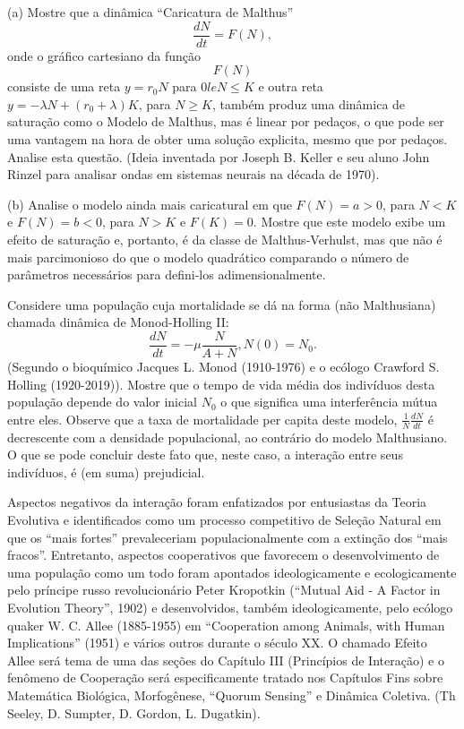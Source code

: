     \begin{exercise}
    \begin{description}
    \item (a) Mostre que a dinâmica ``Caricatura de Malthus''
    \[\dfrac{dN}{dt} =  F(N),\]
    onde o gráfico cartesiano da função \[F(N)\] consiste de uma reta \(y = r_0 N\) para \(0 le N \le K\) e outra reta \(y =-\lambda N + (r_0 + \lambda) K\), para \(N \ge K\), também produz uma dinâmica de saturação como o Modelo de Malthus, mas é linear por pedaços, o que pode ser uma vantagem na hora de obter uma solução explicita, mesmo que por pedaços. Analise esta questão. (Ideia inventada por Joseph B. Keller e seu aluno John Rinzel para analisar ondas em sistemas neurais na década de 1970).
    \item (b) Analise o modelo ainda mais caricatural em que \(F(N) = a > 0\), para \(N < K\) e \(F(N) = b < 0\), para \(N > K\) e \(F(K) = 0\). Mostre que este modelo exibe um efeito de saturação e, portanto, é da classe de Malthus-Verhulst, mas que não é mais parcimonioso do que o modelo quadrático comparando o número de parâmetros necessários para defini-los adimensionalmente.
    \end{description}
    \end{exercise}

    \begin{exercise}
    Considere uma população cuja mortalidade se dá na forma (não Malthusiana) chamada dinâmica de Monod-Holling II:
    \[\dfrac{dN}{dt} = -\mu \dfrac{N}{A+N}, N(0) = N_0.\]
    (Segundo o bioquímico Jacques L. Monod (1910-1976) e o ecólogo Crawford S. Holling (1920-2019)). Mostre que o tempo de vida média dos indivíduos desta população depende do valor inicial \(N_0\) o que significa uma interferência mútua entre eles. Observe que a taxa de mortalidade per capita deste modelo, \(\frac{1}{N} \frac{dN}{dt}\) é decrescente com a densidade populacional, ao contrário do modelo Malthusiano. O que se pode concluir deste fato que, neste caso, a interação entre seus indivíduos, é (em suma) prejudicial.
    \end{exercise}

    Aspectos negativos da interação foram enfatizados por entusiastas da Teoria Evolutiva e identificados como um processo competitivo de Seleção Natural em que os ``mais fortes'' prevaleceriam populacionalmente com a extinção dos ``mais fracos''. Entretanto, aspectos cooperativos que favorecem o desenvolvimento de uma população como um todo foram apontados ideologicamente e ecologicamente pelo príncipe russo revolucionário Peter Kropotkin (``Mutual Aid - A Factor in Evolution Theory'', 1902) e desenvolvidos, também ideologicamente, pelo ecólogo quaker W. C. Allee (1885-1955) em ``Cooperation among Animals, with Human Implications'' (1951) e vários outros durante o século XX. O chamado Efeito Allee será tema de uma das seções do Capítulo III (Princípios de Interação) e o fenômeno de Cooperação será especificamente tratado nos Capítulos Fins sobre Matemática Biológica, Morfogênese, ``Quorum Sensing'' e Dinâmica Coletiva. (Th Seeley, D. Sumpter, D. Gordon, L. Dugatkin).

